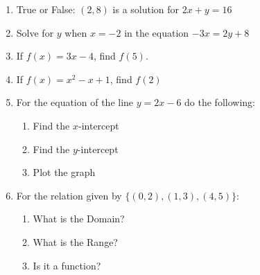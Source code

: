 \documentclass[12pt]{article}
\begin{document}
\begin{enumerate}
\item  True or False:  $(2, 8)$ is a solution for $2x + y = 16$

\item Solve for $y$ when $x = -2$ in the equation  $-3x = 2y + 8$

\item  If $f(x) = 3x - 4$, find $f(5)$.

\item If $f(x) = x^2 -x + 1$, find $f(2)$


\item For the equation of the line $y=2x-6$ do the following:
\begin{enumerate}
	\item Find the $x$-intercept
	\item Find the $y$-intercept
	\item Plot the graph
\end{enumerate}

\item For the relation given by $\{(0, 2), (1, 3), (4, 5)\}$:
\begin{enumerate}
	\item What is the Domain?
	\item What is the Range?
	\item Is it a function?
\end{enumerate}

\newpage


\end{enumerate}
\end{document}
